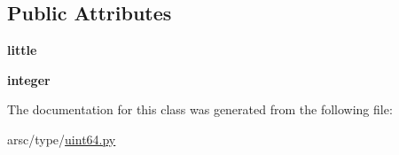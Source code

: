 \subsection*{Public Attributes}
\begin{DoxyCompactItemize}
\item 
\mbox{\label{classarsc_1_1type_1_1uint64_1_1uint64_ae11ee502be75fdc6a5151102c20db8c8}} 
{\bfseries little}
\item 
\mbox{\label{classarsc_1_1type_1_1uint64_1_1uint64_af877a1e186db5241134d290c9b3d0b6d}} 
{\bfseries integer}
\end{DoxyCompactItemize}


The documentation for this class was generated from the following file\+:\begin{DoxyCompactItemize}
\item 
arsc/type/\mbox{\hyperlink{uint64_8py}{uint64.\+py}}\end{DoxyCompactItemize}
